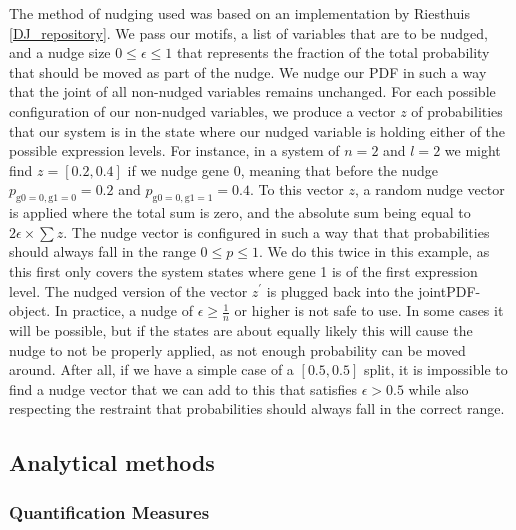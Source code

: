 \documentclass[../main.tex]{subfiles}
\begin{document}
The method of nudging used was based on an implementation by Riesthuis \ref{DJ_repository}.
We pass our motifs, a list of variables that are to be nudged, and a nudge size $0 \le \epsilon \le 1$ that represents the fraction of the total probability that should be moved as part of the nudge.
We nudge our PDF in such a way that the joint of all non-nudged variables remains unchanged.
For each possible configuration of our non-nudged variables, we produce a vector $z$ of probabilities that our system is in the state where our nudged variable is holding either of the possible expression levels.
For instance, in a system of $n=2$ and $l=2$ we might find $z = [0.2, 0.4]$ if we nudge gene 0, meaning that before the nudge $p_\mathrm{g0 = 0, g1=0} = 0.2$ and $p_\mathrm{g0 = 0, g1=1} = 0.4$.
To this vector $z$, a random nudge vector is applied where the total sum is zero, and the absolute sum being equal to $2 \epsilon \times \sum z$.
The nudge vector is configured in such a way that that probabilities should always fall in the range $0 \le p \le 1$.
We do this twice in this example, as this first only covers the system states where gene 1 is of the first expression level.
The nudged version of the vector $z^\prime$ is plugged back into the jointPDF-object.
In practice, a nudge of $\epsilon \ge \frac{1}{n}$ or higher is not safe to use.
In some cases it will be possible, but if the states are about equally likely this will cause the nudge to not be properly applied, as not enough probability can be moved around.
After all, if we have a simple case of a $[0.5, 0.5]$ split, it is impossible to find a nudge vector that we can add to this that satisfies $\epsilon > 0.5$ while also respecting the restraint that probabilities should always fall in the correct range.

\subsection{Analytical methods}

\subsubsection{Quantification Measures}
\end{document}
